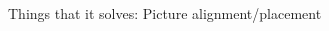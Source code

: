 \documentclass[,aspectratio=43]{beamer}
\begin{document}
\begin{frame}{Things that it solves: Picture alignment/placement}
\begin{columns}[T]
\begin{column}{0.33\textwidth}
\begin{figure}
\end{figure}
\end{column}
\end{columns}
\end{frame}
\end{document}
